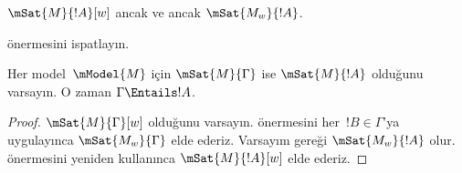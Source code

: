 \begin{prop}
  $\mSat{M}{!A}[w]$ ancak ve ancak $\mSat{M_w}{!A}$.
\end{prop}

\begin{prob}
   önermesini ispatlayın.
\end{prob}

\begin{prop}
  Her model~$\mModel{M}$ için $\mSat{M}{\Gamma}$ ise
  $\mSat{M}{!A}$ olduğunu varsayın. O zaman $\Gamma \Entails !A$.
\end{prop}

\begin{proof}
  $\mSat{M}{\Gamma}[w]$ olduğunu varsayın.  önermesini
  her~$!B \in \Gamma$'ya uygulayınca $\mSat{M_w}{\Gamma}$ elde ederiz.
  Varsayım gereği $\mSat{M_w}{!A}$ olur.  önermesini
  yeniden kullanınca $\mSat{M}{!A}[w]$ elde ederiz.
\end{proof}

